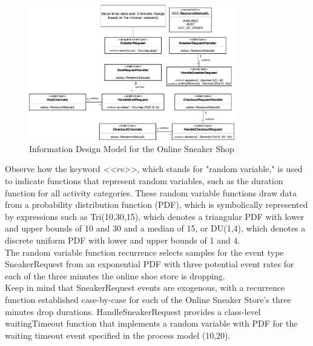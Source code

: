 \documentclass{article}
\begin{document}
\begin{figure}[h]
    \centering
    \includegraphics[width=0.8\textwidth]{Information_Design_Model}
    \caption{Information Design Model for the Online Sneaker Shop}
\end{figure}

\FloatBarrier

Observe how the keyword {\em <<rv>>}, which stands for "random variable," is used to indicate functions that represent random variables, such as the duration function for all activity categories. These random variable functions draw data from a probability distribution function (PDF), which is symbolically represented by expressions such as Tri(10,30,15), which denotes a triangular PDF with lower and upper bounds of 10 and 30 and a median of 15, or DU(1,4), which denotes a discrete uniform PDF with lower and upper bounds of 1 and 4. \\
The random variable function recurrence selects samples for the event type SneakerRequest from an exponential PDF with three potential event rates for each of the three minutes the online shoe store is dropping. \\
Keep in mind that SneakerRequest events are exogenous, with a recurrence function established case-by-case for each of the Online Sneaker Store's three minutes drop durations. HandleSneakerRequest provides a class-level waitingTimeout function that implements a random variable with PDF for the waiting timeout event specified in the process model (10,20).
\end{document}

